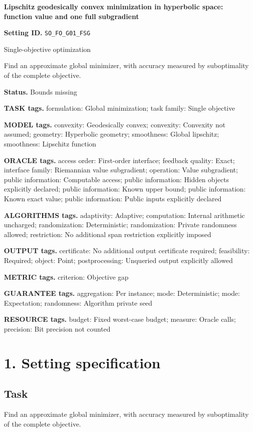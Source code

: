 \documentclass[10pt,a4paper]{article}
\begin{document}
\raggedright

{\LARGE\bfseries\sffamily\color{AtlasNavy} Lipschitz geodesically convex minimization in hyperbolic space: function value and one full subgradient\par}\vspace{5pt}
\textbf{Setting ID.} \texttt{SO\_\allowbreak{}FO\_\allowbreak{}G01\_\allowbreak{}FSG}

Single-objective optimization

Find an approximate global minimizer, with accuracy measured by suboptimality of the complete objective.

\textbf{Status.} Bounds missing

\textbf{TASK tags.} formulation: Global minimization; task family: Single objective

\textbf{MODEL tags.} convexity: Geodesically convex; convexity: Convexity not assumed; geometry: Hyperbolic geometry; smoothness: Global lipschitz; smoothness: Lipschitz function

\textbf{ORACLE tags.} access order: First-order interface; feedback quality: Exact; interface family: Riemannian value subgradient; operation: Value subgradient; public information: Computable access; public information: Hidden objects explicitly declared; public information: Known upper bound; public information: Known exact value; public information: Public inputs explicitly declared

\textbf{ALGORITHMS tags.} adaptivity: Adaptive; computation: Internal arithmetic uncharged; randomization: Deterministic; randomization: Private randomness allowed; restriction: No additional span restriction explicitly imposed

\textbf{OUTPUT tags.} certificate: No additional output certificate required; feasibility: Required; object: Point; postprocessing: Unqueried output explicitly allowed

\textbf{METRIC tags.} criterion: Objective gap

\textbf{GUARANTEE tags.} aggregation: Per instance; mode: Deterministic; mode: Expectation; randomness: Algorithm private seed

\textbf{RESOURCE tags.} budget: Fixed worst-case budget; measure: Oracle calls; precision: Bit precision not counted

\section{1. Setting specification}
\subsection{Task}
Find an approximate global minimizer, with accuracy measured by suboptimality of the complete objective.
\end{document}
